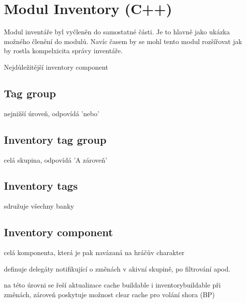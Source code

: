 


\section{Modul Inventory (C++)}

Modul inventáře byl vyčleněn do samostatné části. Je to hlavně jako ukázka možného členění do modulů.  Navíc časem by se mohl tento modul rozšířovat jak by rostla kompelxicita správy inventáře.

Nejdůležitější inventory component


\subsection{Tag group}
nejnižší úroveň, odpovídá 'nebo'

\subsection{Inventory tag group}

celá skupina, odpovídá 'A zároveň'

\subsection{Inventory tags}

sdružuje všechny banky

\subsection{Inventory component}

celá komponenta, která je pak navázaná na hráčův charakter

definuje delegáty notifikující o změnách v akivní skupině, po filtrování apod.

na této úrovni se řeší aktualizace cache buildable i inventorybuildable při změnách, zároveň poskytuje možnost clear cache pro volání shora (BP)

